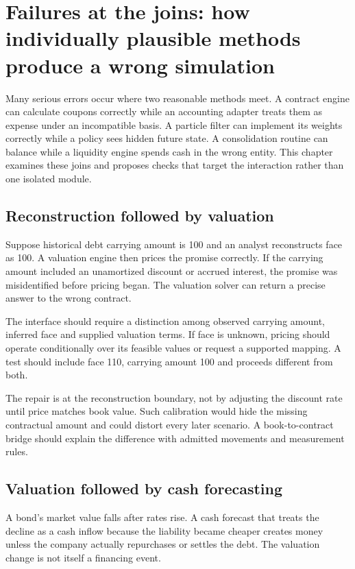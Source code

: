 \chapter[Failures at the joins between methods]{Failures at the joins: how individually plausible methods produce a wrong simulation}
\label{sim:interactions}

Many serious errors occur where two reasonable methods meet. A contract engine can calculate coupons correctly while an accounting adapter treats them as expense under an incompatible basis. A particle filter can implement its weights correctly while a policy sees hidden future state. A consolidation routine can balance while a liquidity engine spends cash in the wrong entity. This chapter examines these joins and proposes checks that target the interaction rather than one isolated module.

\section{Reconstruction followed by valuation}
Suppose historical debt carrying amount is 100 and an analyst reconstructs face as 100. A valuation engine then prices the promise correctly. If the carrying amount included an unamortized discount or accrued interest, the promise was misidentified before pricing began. The valuation solver can return a precise answer to the wrong contract.

The interface should require a distinction among observed carrying amount, inferred face and supplied valuation terms. If face is unknown, pricing should operate conditionally over its feasible values or request a supported mapping. A test should include face 110, carrying amount 100 and proceeds different from both.

The repair is at the reconstruction boundary, not by adjusting the discount rate until price matches book value. Such calibration would hide the missing contractual amount and could distort every later scenario. A book-to-contract bridge should explain the difference with admitted movements and measurement rules.

\section{Valuation followed by cash forecasting}
A bond's market value falls after rates rise. A cash forecast that treats the decline as a cash inflow because the liability became cheaper creates money unless the company actually repurchases or settles the debt. The valuation change is not itself a financing event.

